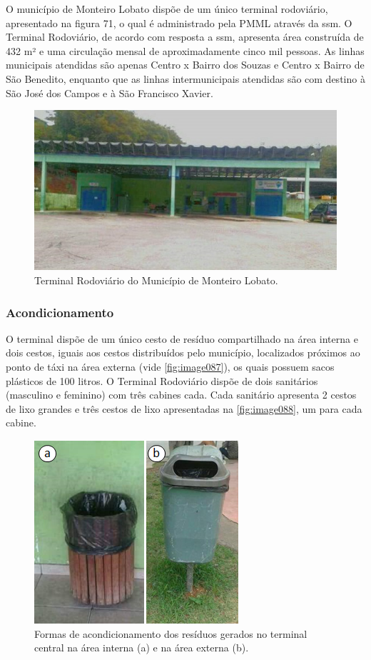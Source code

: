 	O município de Monteiro Lobato dispõe de um único terminal rodoviário, apresentado na figura 71, o qual é administrado pela PMML através da \gls{ssm}. O Terminal Rodoviário, de acordo com resposta a \gls{ssm}, apresenta área construída de 432 m² e uma circulação mensal de aproximadamente cinco mil pessoas. As linhas municipais atendidas são apenas Centro x Bairro dos Souzas e Centro x Bairro de São Benedito, enquanto que as linhas intermunicipais atendidas são com destino à São José dos Campos e à São Francisco Xavier.
	
	\begin{figure}
		\centering
		\includegraphics[width=0.7\linewidth]{produtos/prodtres/image086}
		\caption{Terminal Rodoviário do Município de Monteiro Lobato.}
		\label{fig:image086}
	\end{figure}
	
	
	\subsubsection{Acondicionamento}
	O terminal dispõe de um único cesto de resíduo compartilhado na área interna e dois cestos, iguais aos cestos distribuídos pelo município, localizados próximos ao ponto de táxi na área externa (vide \autoref{fig:image087}), os quais possuem sacos plásticos de 100 litros. O Terminal Rodoviário dispõe de dois sanitários (masculino e feminino) com três cabines cada. Cada sanitário apresenta 2 cestos de lixo grandes e três cestos de lixo apresentadas na \autoref{fig:image088}, um para cada cabine.
	
	\begin{figure}
		\centering
		\includegraphics[width=0.4\linewidth]{produtos/prodtres/image087}
		\caption{Formas de acondicionamento dos resíduos gerados no terminal central na área interna (a) e na área externa (b).}
		\label{fig:image087}
	\end{figure}
	
